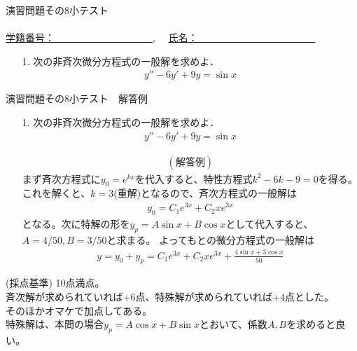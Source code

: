 \documentclass[11pt]{jarticle}
\begin{document}
\begin{center}
{\Large
演習問題その8小テスト}\\
\ \\
\underline{学籍番号：　　　　　　　　　　},　
\underline{氏名：　　　　　　　　　　　　}
\end{center}
\begin{enumerate}
\item[1.]
次の非斉次微分方程式の一般解を求めよ．
\begin{eqnarray*}
y''-6y'+9y=\sin{x}
\end{eqnarray*}


\end{enumerate}


\newpage
\begin{center}
{\Large
演習問題その8小テスト　解答例}\\
\end{center}
\begin{enumerate}
\item[1.]
次の非斉次微分方程式の一般解を求めよ．
\begin{eqnarray*}
y''-6y'+9y=\sin{x}
\end{eqnarray*}

\begin{eqnarray*}
(解答例)
\end{eqnarray*}
まず斉次方程式に$y_0=e^{kx}$を代入すると、特性方程式$k^2-6k-9=0$を得る。
これを解くと、$k=3$(重解)となるので、斉次方程式の一般解は
\begin{eqnarray*}
y_0=C_1e^{3x}+C_2xe^{3x}
\end{eqnarray*}
となる。次に特解の形を$y_p=A\sin{x}+B\cos{x}$として代入すると、$A=4/50, B=3/50$と求まる。
よってもとの微分方程式の一般解は
\begin{eqnarray*}
y=y_0+y_p=C_1e^{3x}+C_2xe^{3x}+\frac{4\sin{x}+3\cos{x}}{50}
\end{eqnarray*}

\end{enumerate}

\newpage
(採点基準)
10点満点。\\
斉次解が求められていれば+6点、特殊解が求められていれば+4点とした。\\
そのほかオマケで加点してある。\\
特殊解は、本問の場合$y_p=A\cos x+B\sin x$とおいて、係数$A,B$を求めると良い。
\end{document}
